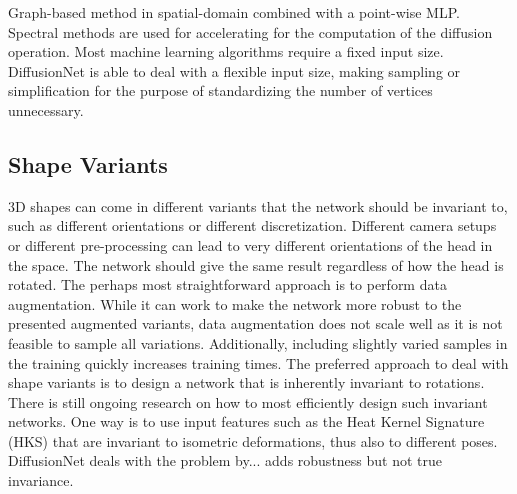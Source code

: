 \documentclass[class=article, crop=false]{standalone}
\begin{document}
Graph-based method in spatial-domain combined with a point-wise MLP. Spectral methods are used for accelerating for the computation of the diffusion operation.
Most machine learning algorithms require a fixed input size. DiffusionNet is able to deal with a flexible input size, making sampling or simplification for the purpose of standardizing the number of vertices unnecessary.

\subsection{Shape Variants}
3D shapes can come in different variants that the network should be invariant to, such as different orientations or different discretization. Different camera setups or different pre-processing can lead to very different orientations of the head in the space. The network should give the same result regardless of how the head is rotated. The perhaps most straightforward approach is to perform data augmentation. While it can work to make the network more robust to the presented augmented variants, data augmentation does not scale well as it is not feasible to sample all variations. Additionally, including slightly varied samples in the training quickly increases training times. The preferred approach to deal with shape variants is to design a network that is inherently invariant to rotations. There is still ongoing research on how to most efficiently design such invariant networks. One way is to use input features such as the Heat Kernel Signature (HKS) that are invariant to isometric deformations, thus also to different poses. DiffusionNet deals with the problem by... adds robustness but not true invariance.
\end{document}

